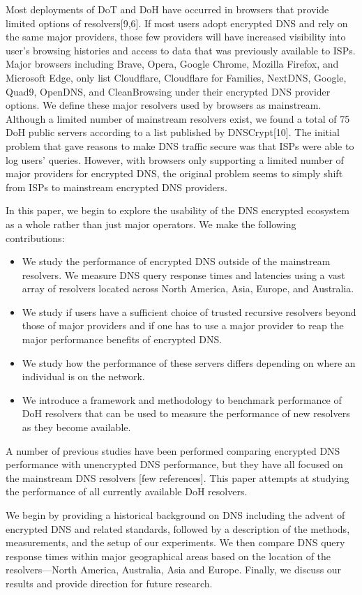 Most deployments of DoT and DoH have occurred in browsers that provide limited options of resolvers[9,6].
If most users adopt encrypted DNS and rely on the same major providers, those few providers will have increased visibility into user's browsing histories and access to data that was previously available to ISPs.
Major browsers including Brave, Opera, Google Chrome, Mozilla Firefox, and Microsoft Edge, only list Cloudflare, Cloudflare for Families, NextDNS, Google, Quad9, OpenDNS, and CleanBrowsing under their encrypted DNS provider options.
We define these major resolvers used by browsers as mainstream.
Although a limited number of mainstream resolvers exist, we found a total of 75 DoH public servers according to a list published by DNSCrypt[10]. 
The initial problem that gave reasons to make DNS traffic secure was that ISPs were able to log users' queries.
However, with browsers only supporting a limited number of major providers for encrypted DNS, the original problem seems to simply shift from ISPs to mainstream encrypted DNS providers.

In this paper, we begin to explore the usability of the DNS encrypted ecosystem as a whole rather than just major operators. We make the following contributions:
\begin{itemize}
\setlength\itemsep{0em}
\item We study the performance of encrypted DNS outside of the mainstream resolvers. We measure DNS query response times and latencies using a vast array of resolvers located across North America, Asia, Europe, and Australia. 
\item We study if users have a sufficient choice of trusted recursive resolvers beyond those of major providers and if one has to use a major provider to reap the major performance benefits of encrypted DNS.
\item We study how the performance of these servers differs depending on where an individual is on the network.
\item We introduce a framework and methodology to benchmark performance of DoH resolvers that can be used to measure the performance of new resolvers as they become available.
\end{itemize}

A number of previous studies have been performed comparing encrypted DNS performance with unencrypted DNS performance, but they have all focused on the mainstream DNS resolvers [few references].
This paper attempts at studying the performance of all currently available DoH resolvers.

We begin by providing a historical background on DNS including the advent of encrypted DNS and related standards, followed by a description of the methods, measurements, and the setup of our experiments.
We then compare DNS query response times within major geographical areas based on the location of the resolvers—North America, Australia, Asia and Europe.
Finally, we discuss our results and provide direction for future research.